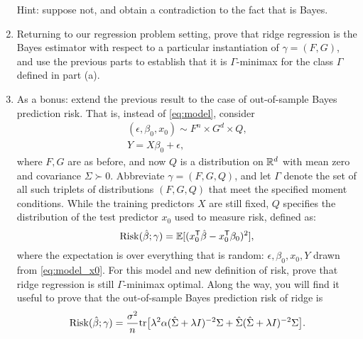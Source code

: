 \documentclass{article}
\begin{document}
\begin{enumerate}[label=(\alph*)]
  Hint: suppose not, and obtain a contradiction to the fact that
   is Bayes. 

\item Returning to our regression problem setting, prove that ridge regression
  is the Bayes estimator with respect to a particular instantiation of $\gamma = 
  (F,G)$, and use the previous parts to establish that it is $\Gamma$-minimax
  for the class $\Gamma$ defined in part (a).  
  \marginpar{\small [3 pts]}

\item As a bonus: extend the previous result to the case of out-of-sample Bayes
  prediction risk. That is, instead of \eqref{eq:model}, consider
  \begin{equation}
  \label{eq:model_x0}
  \begin{gathered}
  (\epsilon, \beta_0,  x_0) \sim F^n \times G^d \times Q, \\
  Y = X\beta_0 + \epsilon,
  \end{gathered}
  \end{equation}
  where $F,G$ are as before, and now $Q$ is a distribution on $\mathbb{R}^d$ with mean
  zero and covariance $\Sigma \succ 0$. Abbreviate $\gamma = (F,G,Q)$, and let
  $\Gamma$ denote the set of all such triplets of distributions $(F,G,Q)$ that
  meet the specified moment conditions. While the training predictors $X$ are
  still fixed, $Q$ specifies the distribution of the test predictor $x_0$ used
  to measure risk, defined as: 
  \[
  \mathrm{Risk}(\hat{\beta}; \gamma) = \mathbb{E}[ (x_0^{\mathsf{T}} \hat{\beta} - x_0^{\mathsf{T}} \beta_0)^2 ], 
  \]
  where the expectation is over everything that is random: $\epsilon, \beta_0,
  x_0, Y$ drawn from \eqref{eq:model_x0}. For this model and new definition of
  risk, prove that ridge regression is still $\Gamma$-minimax optimal. Along the
  way, you will find it useful to prove that the out-of-sample Bayes prediction 
  risk of ridge is  
  \[
  \mathrm{Risk}(\hat{\beta}; \gamma) = \frac{\sigma^2}{n} \mathrm{tr} \big[ \lambda^2 \alpha (\hat\Sigma
  + \lambda I)^{-2} \Sigma + \hat\Sigma ( \hat\Sigma + \lambda I)^{-2} \Sigma \big].
  \]
\end{enumerate}




\end{document}
